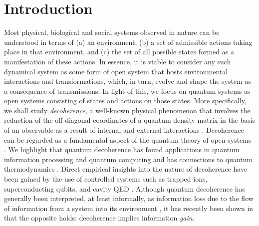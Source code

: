 \documentclass[12pt,a4paper]{article}
\begin{document}
\section{Introduction}
Most physical, biological and social systems observed in nature can be understood in terms of (a) an environment, (b) a set of admissible actions taking place in that environment, and (c) the set of all possible states formed as a manifestation of these actions. In essence, it is viable to consider any such dynamical system as some form of open system that hosts environmental interactions and transformations, which, in turn, evolve and shape the system as a consequence of transmissions. In light of this, we focus on quantum systems as open systems consisting of states and actions on those states. 
More specifically, we shall study \emph{decoherence}, a well-known physical phenomenon that involves the reduction of the off-diagonal coordinates of a quantum density matrix in the basis of an observable as a result of internal and external interactions \cite{Zeh 1970, Joos Zeh 1985,   Joos et al 2003, Schlosshauer 2004, Zurek 2003 RMP,  Schlosshauer 2005, Schlosshauser 2010,  Zurek 2022}. Decoherence can be regarded as a fundamental aspect of the quantum theory of open systems \cite{Davies 1976, Gisin Percival 1992,  Breuer Petruccione 2004, Rivas Huelga 2012}. We highlight that quantum decoherence has found applications in quantum information processing \cite{Shabani Lidar 2009, Breuer Amato Vacchini 2018, Zurek 2025} and quantum computing \cite{ Preskill 1998, Zurek 2003 PRL, Shor 1995} and has connections to quantum thermodynamics \cite{Gemmer et al 2009, Popescu et al 2006, Esposito et al 2009}. Direct empirical insights into the nature of decoherence have been gained by the use of controlled systems such as trapped ions, superconducting qubits, and cavity QED \cite{Monroe et al 1996, Brune et al 1996, Myatt et al 2000}. Although quantum decoherence has generally been interpreted, at least informally, as information loss due to the flow of information from a system into its environment \cite{Zurek 1991, Zurek 2009}, it has recently been shown in \cite{Brody Hughston 2025} that the opposite holds: decoherence implies information \emph{gain}. 
\end{document}
